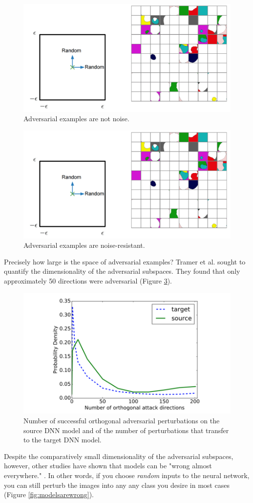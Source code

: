 \documentclass[10pt]{article}
\begin{document}
\begin{figure}[!h]
\centering
\includegraphics[width=0.5\linewidth]{notnoise}
\caption{Adversarial examples are not noise.}
\label{fig:notnoise}
\end{figure}

\begin{figure}[!h]
\centering
\includegraphics[width=0.5\linewidth]{notnoise}
\caption{Adversarial examples are noise-resistant.}
\label{fig:noise_res}
\end{figure}

Precisely how large is the space of adversarial examples?  Tramer et al. \cite{Tramer2017} sought to quantify the dimensionality of the adversarial subspaces. They found that only approximately 50 directions were adversarial (Figure \ref{fig:dimension}).
\begin{figure}[!h]
\centering
\includegraphics[width=0.5\linewidth]{dimension}
\caption{Number of successful orthogonal adversarial perturbations on the source DNN model and of the number of perturbations that transfer to the target DNN model.}
\label{fig:dimension}
\end{figure}

Despite the comparatively small dimensionality of the adversarial subspaces, however, other studies have shown that models can be "wrong almost everywhere." \cite{goodfellow2014}. In other words, if you choose \textit{random} inputs to the neural network, you can still perturb the images into any any class you desire in most cases (Figure \ref{fig:modelsarewrong}).
\end{document}
